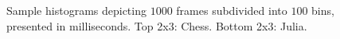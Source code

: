 
\begin{figure}
  \setlength{\abovecaptionskip}{0pt}
  \setlength{\belowcaptionskip}{0pt}
  \centering
  
  
  \caption{Sample histograms depicting $1000$ frames subdivided into $100$ bins, presented in milliseconds. Top 2x3: Chess. Bottom 2x3: Julia.}
  \label{fig:histogram}
\end{figure}
